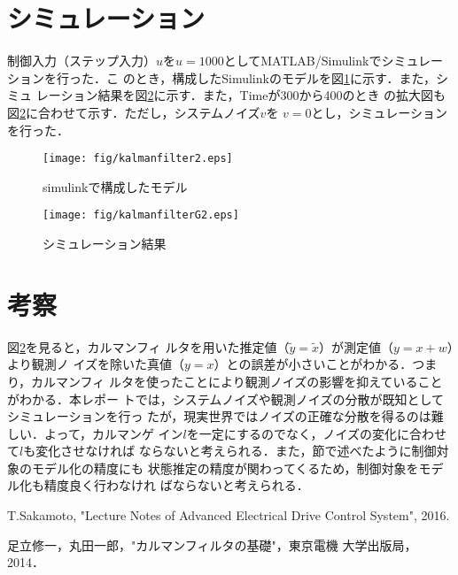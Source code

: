 \documentclass[a4paper,12pt]{jarticle}
\begin{document}
\section{シミュレーション}
制御入力（ステップ入力）$u$を$u=1000$としてMATLAB/Simulinkでシミュレーションを行った．こ
のとき，構成したSimulinkのモデルを図\ref{fig:kalman_b}に示す．また，シミュ
レーション結果を図\ref{fig:kalman_g}に示す．また，Timeが300から400のとき
の拡大図も図\ref{fig:kalman_g}に合わせて示す．ただし，システムノイズ$v$を
$v=0$とし，シミュレーションを行った．
%
\begin{figure}[bp]
 \begin{center}
  \texttt{[image: fig/kalmanfilter2.eps]}
 \end{center}
 \caption{simulinkで構成したモデル}
 \label{fig:kalman_b}
\end{figure}
%
\begin{figure}[htbp]
 \begin{center}
  \texttt{[image: fig/kalmanfilterG2.eps]}
 \end{center}
 \caption{シミュレーション結果}
 \label{fig:kalman_g}
\end{figure}
%
\newpage
\section{考察}
図\ref{fig:kalman_g}を見ると，カルマンフィ
ルタを用いた推定値（$\tilde{y}=\tilde{x}$）が測定値（$y=x+w$）より観測ノ
イズを除いた真値（$y=x$）との誤差が小さいことがわかる．つまり，カルマンフィ
ルタを使ったことにより観測ノイズの影響を抑えていることがわかる．本レポー
トでは，システムノイズや観測ノイズの分散が既知としてシミュレーションを行っ
たが，現実世界ではノイズの正確な分散を得るのは難しい．よって，カルマンゲ
イン$l$を一定にするのでなく，ノイズの変化に合わせて$l$も変化させなければ
ならないと考えられる．また，節で述べたように制御対象のモデル化の精度にも
状態推定の精度が関わってくるため，制御対象をモデル化も精度良く行わなけれ
ばならないと考えられる．
%
\begin{thebibliography}{99}

  T.Sakamoto,
		 "Lecture Notes of Advanced Electrical Drive Control System", 2016.

  足立修一，丸田一郎，"カルマンフィルタの基礎"，東京電機
		 大学出版局，2014．

\end{thebibliography}
\end{document}
